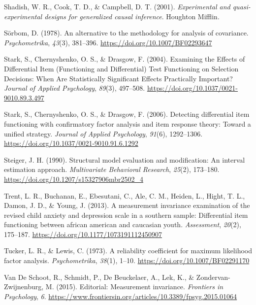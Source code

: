 \documentclass[
  man]{apa7}
\newlength{\cslhangindent}
\newenvironment{CSLReferences}[2] %
 {\begin{list}{}{%
  \setlength{\itemindent}{0pt}
  \setlength{\leftmargin}{0pt}
  \setlength{\parsep}{0pt}
  \ifodd #1
   \setlength{\leftmargin}{\cslhangindent}
   \setlength{\itemindent}{-1\cslhangindent}
  \fi
  \setlength{\itemsep}{#2\baselineskip}}}
 {\end{list}}
\begin{document}
\begin{CSLReferences}{1}{0}
Shadish, W. R., Cook, T. D., \& Campbell, D. T. (2001). \emph{Experimental and quasi-experimental designs for generalized causal inference}. Houghton Mifflin.

Sörbom, D. (1978). An alternative to the methodology for analysis of covariance. \emph{Psychometrika}, \emph{43}(3), 381--396. \url{https://doi.org/10.1007/BF02293647}

Stark, S., Chernyshenko, O. S., \& Drasgow, F. (2004). Examining the Effects of Differential Item (Functioning and Differential) Test Functioning on Selection Decisions: When Are Statistically Significant Effects Practically Important? \emph{Journal of Applied Psychology}, \emph{89}(3), 497--508. \url{https://doi.org/10.1037/0021-9010.89.3.497}

Stark, S., Chernyshenko, O. S., \& Drasgow, F. (2006). Detecting differential item functioning with confirmatory factor analysis and item response theory: Toward a unified strategy. \emph{Journal of Applied Psychology}, \emph{91}(6), 1292--1306. \url{https://doi.org/10.1037/0021-9010.91.6.1292}

Steiger, J. H. (1990). Structural model evaluation and modification: An interval estimation approach. \emph{Multivariate Behavioral Research}, \emph{25}(2), 173--180. \url{https://doi.org/10.1207/s15327906mbr2502_4}

Trent, L. R., Buchanan, E., Ebesutani, C., Ale, C. M., Heiden, L., Hight, T. L., Damon, J. D., \& Young, J. (2013). A measurement invariance examination of the revised child anxiety and depression scale in a southern sample: Differential item functioning between african american and caucasian youth. \emph{Assessment}, \emph{20}(2), 175--187. \url{https://doi.org/10.1177/1073191112450907}

Tucker, L. R., \& Lewis, C. (1973). A reliability coefficient for maximum likelihood factor analysis. \emph{Psychometrika}, \emph{38}(1), 1--10. \url{https://doi.org/10.1007/BF02291170}

Van De Schoot, R., Schmidt, P., De Beuckelaer, A., Lek, K., \& Zondervan-Zwijnenburg, M. (2015). Editorial: Measurement invariance. \emph{Frontiers in Psychology}, \emph{6}. \url{https://www.frontiersin.org/articles/10.3389/fpsyg.2015.01064}


\end{CSLReferences}
\end{document}
